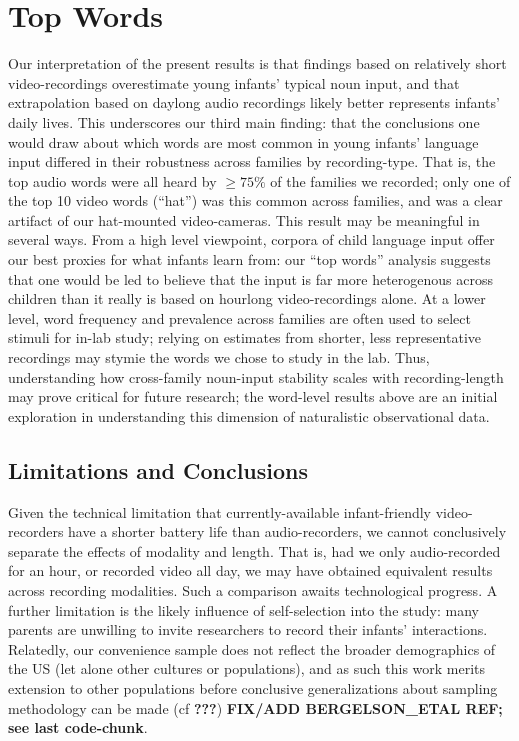 \documentclass[floatsintext,man]{apa6}
\theoremstyle{definition}
\theoremstyle{definition}
\theoremstyle{definition}
\theoremstyle{remark}
\begin{document}
\section{Top Words}\label{top-words}

Our interpretation of the present results is that findings based on
relatively short video-recordings overestimate young infants' typical
noun input, and that extrapolation based on daylong audio recordings
likely better represents infants' daily lives. This underscores our
third main finding: that the conclusions one would draw about which
words are most common in young infants' language input differed in their
robustness across families by recording-type. That is, the top audio
words were all heard by \(\geq 75\%\) of the families we recorded; only
one of the top 10 video words (\enquote{hat}) was this common across
families, and was a clear artifact of our hat-mounted video-cameras.
This result may be meaningful in several ways. From a high level
viewpoint, corpora of child language input offer our best proxies for
what infants learn from: our \enquote{top words} analysis suggests that
one would be led to believe that the input is far more heterogenous
across children than it really is based on hourlong video-recordings
alone. At a lower level, word frequency and prevalence across families
are often used to select stimuli for in-lab study; relying on estimates
from shorter, less representative recordings may stymie the words we
chose to study in the lab. Thus, understanding how cross-family
noun-input stability scales with recording-length may prove critical for
future research; the word-level results above are an initial exploration
in understanding this dimension of naturalistic observational data.

\subsection{Limitations and
Conclusions}\label{limitations-and-conclusions}

Given the technical limitation that currently-available infant-friendly
video-recorders have a shorter battery life than audio-recorders, we
cannot conclusively separate the effects of modality and length. That
is, had we only audio-recorded for an hour, or recorded video all day,
we may have obtained equivalent results across recording modalities.
Such a comparison awaits technological progress. A further limitation is
the likely influence of self-selection into the study: many parents are
unwilling to invite researchers to record their infants' interactions.
Relatedly, our convenience sample does not reflect the broader
demographics of the US (let alone other cultures or populations), and as
such this work merits extension to other populations before conclusive
generalizations about sampling methodology can be made (cf
{\textbf{???}}) \textbf{FIX/ADD BERGELSON\_ETAL REF; see last
code-chunk}.
\end{document}
